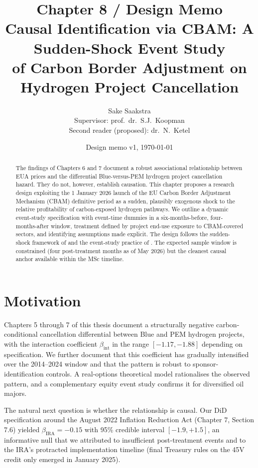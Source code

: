 \documentclass[11pt,a4paper]{article}
\title{\textbf{Chapter 8 / Design Memo}\\[0.3em]
Causal Identification via CBAM: A Sudden-Shock Event Study\\
of Carbon Border Adjustment on Hydrogen Project Cancellation}
\author{Sake Saakstra \\ \small Supervisor: prof.\ dr.\ S.J.\ Koopman \\ \small Second reader (proposed): dr.\ N.\ Ketel}
\date{Design memo v1, \today}
\newcommand{\bint}{\beta_{\mathrm{int}}}
\begin{document}
\maketitle

\begin{abstract}
The findings of Chapters 6 and 7 document a robust associational relationship between EUA prices and the differential Blue-versus-PEM hydrogen project cancellation hazard. They do not, however, establish causation. This chapter proposes a research design exploiting the 1 January 2026 launch of the EU Carbon Border Adjustment Mechanism (CBAM) definitive period as a sudden, plausibly exogenous shock to the relative profitability of carbon-exposed hydrogen pathways. We outline a dynamic event-study specification with event-time dummies in a six-months-before, four-months-after window, treatment defined by project end-use exposure to CBAM-covered sectors, and identifying assumptions made explicit. The design follows the sudden-shock framework of \citet{hanemaaijer2024minority} and the event-study practice of \citet{bindler2022scaring}. The expected sample window is constrained (four post-treatment months as of May 2026) but the cleanest causal anchor available within the MSc timeline.
\end{abstract}

\section{Motivation}
\label{sec:ch8-motivation}

Chapters 5 through 7 of this thesis document a structurally negative carbon-conditional cancellation differential between Blue and PEM hydrogen projects, with the interaction coefficient $\bint$ in the range $[-1.17, -1.88]$ depending on specification. We further document that this coefficient has gradually intensified over the 2014--2024 window and that the pattern is robust to sponsor-identification controls. A real-options theoretical model rationalises the observed pattern, and a complementary equity event study confirms it for diversified oil majors.

The natural next question is whether the relationship is causal. Our DiD specification around the August 2022 Inflation Reduction Act (Chapter 7, Section 7.6) yielded $\beta_{\mathrm{IRA}} = -0.15$ with 95\% credible interval $[-1.9, +1.5]$, an informative null that we attributed to insufficient post-treatment events and to the IRA's protracted implementation timeline (final Treasury rules on the 45V credit only emerged in January 2025).
\end{document}
